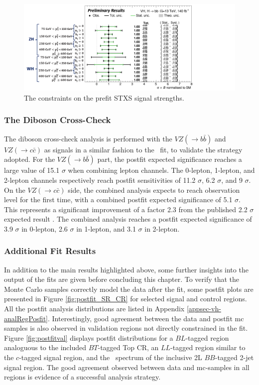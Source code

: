 \begin{figure}[h!]
    \centering
    \includegraphics[width=\textwidth]{Images/VH/Fit/fromSlides/STXS_cons.png}
    \caption{The constraints on the prefit STXS signal strengths.}
    \label{fig:fit-stxs-cons}
\end{figure} 

\subsubsection{The Diboson Cross-Check}\label{subsec-DibosonC}
The diboson cross-check analysis is performed with the $VZ (\rightarrow b\bar{b})$ and $VZ (\rightarrow c\bar{c})$ as signals in a similar fashion to the \vhbc\ fit, to validate the strategy adopted. For the $VZ (\rightarrow b\bar{b})$ part, the postfit expected significance reaches a large value of 15.1 $\sigma$ when combining lepton channels. The 0-lepton, 1-lepton, and 2-lepton channels respectively reach postfit sensitivities of 11.2 $\sigma$, 6.2 $\sigma$, and 9 $\sigma$. On the $VZ (\rightarrow c\bar{c})$ side, the combined analysis expects to reach observation level for the first time, with a combined postfit expected significance of 5.1 $\sigma$. This represents a significant improvement of a factor 2.3 from the published 2.2 $\sigma$ expected result \cite{Collaboration:2721696}. The combined analysis reaches a postfit expected significance of 3.9 $\sigma$ in 0-lepton, 2.6 $\sigma$ in 1-lepton, and 3.1 $\sigma$ in 2-lepton.

\subsubsection{Additional Fit Results}
In addition to the main results highlighted above, some further insights into the output of the fits are given before concluding this chapter. To verify that the Monte Carlo samples correctly model the data after the fit, some postfit plots are presented in Figure \ref{fig:postfit_SR_CR} for selected signal and control regions. All the postfit analysis distributions are listed in Appendix \ref{appsec-vh-analRegPosfit}. Interestingly, good agreement between the data and postfit \gls{mc} samples is also observed in validation regions not directly constrained in the fit. Figure \ref{fig:postfitval} displays postfit distributions for a $BL$-tagged region analoguous to the included $BT$-tagged Top CR, an $LL$-tagged region similar to the $c$-tagged signal region, and the \ptv\ spectrum of the inclusive 2L $BB$-tagged 2-jet signal region. The good agreement observed between data and \gls{mc}-samples in all regions is evidence of a successful analysis strategy. \\


